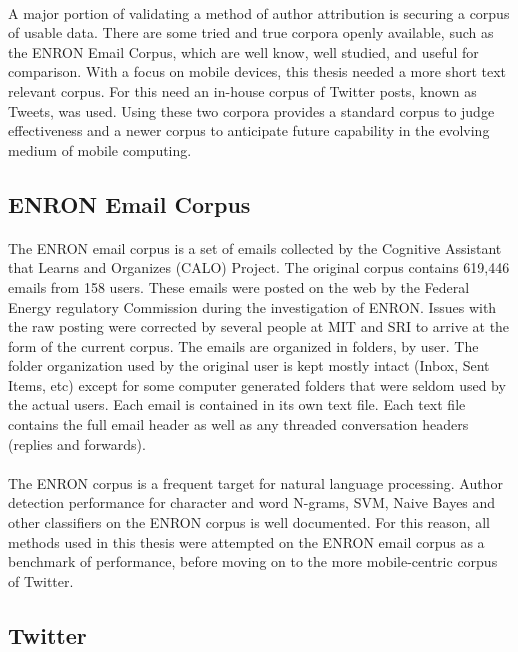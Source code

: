 	\paragraph{}A major portion of validating a method of author attribution is securing a corpus of usable data.  There are some tried and true corpora openly available, such as the ENRON Email Corpus, which are well know, well studied, and useful for comparison.  With a focus on mobile devices, this thesis needed a more short text relevant corpus.  For this need an in-house corpus of Twitter posts, known as Tweets, was used.  Using these two corpora provides a standard corpus to judge effectiveness and a newer corpus to anticipate future capability in the evolving medium of mobile computing.
	\subsection{ENRON Email Corpus}
		\paragraph{} The ENRON email corpus is a set of emails collected by the Cognitive Assistant that Learns and Organizes (CALO) Project.  The original corpus contains 619,446 emails from 158 users.  These emails were posted on the web by the Federal Energy regulatory Commission during the investigation of ENRON.  Issues with the raw posting were corrected by several people at MIT and SRI to arrive at the form of the current corpus.  The emails are organized in folders, by user.  The folder organization used by the original user is kept mostly intact (Inbox, Sent Items, etc) except for some computer generated folders that were seldom used by the actual users.  Each email is contained in its own text file.  Each text file contains the full email header as well as any threaded conversation headers (replies and forwards).\cite{_enron_????}
		\paragraph{} The ENRON corpus is a frequent target for natural language processing.  Author detection performance for character and word N-grams, SVM, Naive Bayes and other classifiers on the ENRON corpus is well documented. For this reason, all methods used in this thesis were attempted on the ENRON email corpus as a benchmark of performance, before moving on to the more mobile-centric corpus of Twitter.

	\subsection{Twitter}
